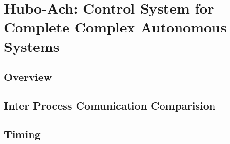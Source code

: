 \chapter{Hubo-Ach: Control System for Complete Complex Autonomous Systems}\label{sec:hubo-ach}

\section{Overview}




\section{Inter Process Comunication Comparision}
	
\section{Timing}
	
